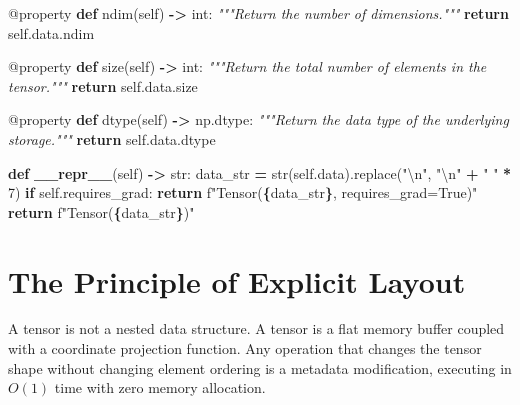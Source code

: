 \documentclass[
  letterpaper,
]{scrbook}
\newenvironment{Shaded}{\begin{snugshade}}{\end{snugshade}}
\newcommand{\AttributeTok}[1]{\textcolor[rgb]{0.13,0.29,0.53}{#1}}
\newcommand{\BuiltInTok}[1]{#1}
\newcommand{\CharTok}[1]{\textcolor[rgb]{0.31,0.60,0.02}{#1}}
\newcommand{\CommentTok}[1]{\textcolor[rgb]{0.56,0.35,0.01}{\textit{#1}}}
\newcommand{\ControlFlowTok}[1]{\textcolor[rgb]{0.13,0.29,0.53}{\textbf{#1}}}
\newcommand{\DecValTok}[1]{\textcolor[rgb]{0.00,0.00,0.81}{#1}}
\newcommand{\FunctionTok}[1]{\textcolor[rgb]{0.13,0.29,0.53}{\textbf{#1}}}
\newcommand{\KeywordTok}[1]{\textcolor[rgb]{0.13,0.29,0.53}{\textbf{#1}}}
\newcommand{\NormalTok}[1]{#1}
\newcommand{\OperatorTok}[1]{\textcolor[rgb]{0.81,0.36,0.00}{\textbf{#1}}}
\newcommand{\SpecialCharTok}[1]{\textcolor[rgb]{0.81,0.36,0.00}{\textbf{#1}}}
\newcommand{\SpecialStringTok}[1]{\textcolor[rgb]{0.31,0.60,0.02}{#1}}
\newcommand{\StringTok}[1]{\textcolor[rgb]{0.31,0.60,0.02}{#1}}
\newcommand{\VariableTok}[1]{\textcolor[rgb]{0.00,0.00,0.00}{#1}}
\begin{document}
\begin{Shaded}
\begin{Highlighting}[]
    \AttributeTok{@property}
    \KeywordTok{def}\NormalTok{ ndim(}\VariableTok{self}\NormalTok{) }\OperatorTok{{-}\textgreater{}} \BuiltInTok{int}\NormalTok{:}
        \CommentTok{"""Return the number of dimensions."""}
        \ControlFlowTok{return} \VariableTok{self}\NormalTok{.data.ndim}

    \AttributeTok{@property}
    \KeywordTok{def}\NormalTok{ size(}\VariableTok{self}\NormalTok{) }\OperatorTok{{-}\textgreater{}} \BuiltInTok{int}\NormalTok{:}
        \CommentTok{"""Return the total number of elements in the tensor."""}
        \ControlFlowTok{return} \VariableTok{self}\NormalTok{.data.size}

    \AttributeTok{@property}
    \KeywordTok{def}\NormalTok{ dtype(}\VariableTok{self}\NormalTok{) }\OperatorTok{{-}\textgreater{}}\NormalTok{ np.dtype:}
        \CommentTok{"""Return the data type of the underlying storage."""}
        \ControlFlowTok{return} \VariableTok{self}\NormalTok{.data.dtype}

    \KeywordTok{def} \FunctionTok{\_\_repr\_\_}\NormalTok{(}\VariableTok{self}\NormalTok{) }\OperatorTok{{-}\textgreater{}} \BuiltInTok{str}\NormalTok{:}
\NormalTok{        data\_str }\OperatorTok{=} \BuiltInTok{str}\NormalTok{(}\VariableTok{self}\NormalTok{.data).replace(}\StringTok{"}\CharTok{\textbackslash{}n}\StringTok{"}\NormalTok{, }\StringTok{"}\CharTok{\textbackslash{}n}\StringTok{"} \OperatorTok{+} \StringTok{" "} \OperatorTok{*} \DecValTok{7}\NormalTok{)}
        \ControlFlowTok{if} \VariableTok{self}\NormalTok{.requires\_grad:}
            \ControlFlowTok{return} \SpecialStringTok{f"Tensor(}\SpecialCharTok{\{}\NormalTok{data\_str}\SpecialCharTok{\}}\SpecialStringTok{, requires\_grad=True)"}
        \ControlFlowTok{return} \SpecialStringTok{f"Tensor(}\SpecialCharTok{\{}\NormalTok{data\_str}\SpecialCharTok{\}}\SpecialStringTok{)"}
\end{Highlighting}
\end{Shaded}

\section{The Principle of Explicit
Layout}\label{the-principle-of-explicit-layout}

A tensor is not a nested data structure. A tensor is a flat memory
buffer coupled with a coordinate projection function. Any operation that
changes the tensor shape without changing element ordering is a metadata
modification, executing in \(O(1)\) time with zero memory allocation.
\end{document}
